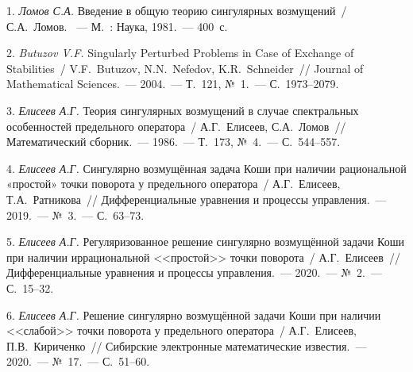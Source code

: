 \litlist

1. {\it Ломов С.А.} Введение в общую теорию сингулярных возмущений~/ С.А.~Ломов. ~--- М.~: Наука, 1981.~--- 400~с.

2. {\it Butuzov V.F.} Singularly Perturbed Problems in Case of Exchange of Stabilities~/ V.F.~Butuzov, N.N.~Nefedov, K.R.~Schneider~// Journal of Mathematical Sciences.~--- 2004.~--- Т.~121, №~1.~--- С.~1973--2079.

3. {\it Елисеев А.Г.} Теория сингулярных возмущений в случае спектральных особенностей предельного оператора~/ А.Г.~Елисеев, \linebreak С.А.~Ломов~// Математический сборник.~--- 1986.~--- Т.~173, №~4.~--- С.~544--557.

4. {\it Елисеев А.Г.} Сингулярно возмущённая задача Коши при наличии рациональной «простой» точки поворота у предельного оператора~/ А.Г.~Елисеев, Т.А.~Ратникова~// Дифференциальные уравнения и процессы управления.~--- 2019.~--- №~3.~--- С.~63--73.

5. {\it Елисеев А.Г.} Регуляризованное решение сингулярно возмущённой задачи Коши при наличии иррациональной <<простой>> точки поворота~/ А.Г.~Елисеев~// Дифференциальные уравнения и процессы управления.~--- 2020.~--- №~2.~--- С.~15--32.

6. {\it Елисеев А.Г.} Решение сингулярно возмущённой задачи Коши при наличии <<слабой>> точки поворота у предельного оператора~/ А.Г.~Елисеев, П.В.~Кириченко~// Сибирские электронные математические известия.~--- 2020.~--- №~17.~--- С.~51--60.

